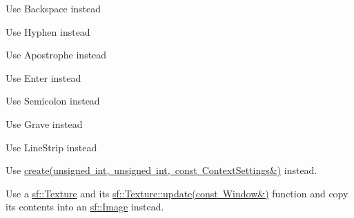 \begin{DoxyRefList}
%
Use Backspace instead  
\item[Member \mbox{\hyperlink{classsf_1_1Keyboard_acb4cacd7cc5802dec45724cf3314a142a401a183dcfde0a06cb60fe6c91fa1e39}{sf\+::Keyboard\+::Dash}} ]\label{deprecated__deprecated000020}%
%
Use Hyphen instead  
\item[Member \mbox{\hyperlink{classsf_1_1Keyboard_acb4cacd7cc5802dec45724cf3314a142af031edb6bcf319734a6664388958c475}{sf\+::Keyboard\+::Quote}} ]\label{deprecated__deprecated000025}%
%
Use Apostrophe instead  
\item[Member \mbox{\hyperlink{classsf_1_1Keyboard_acb4cacd7cc5802dec45724cf3314a142ac291de81bdee518d636bc359f2ca77de}{sf\+::Keyboard\+::Return}} ]\label{deprecated__deprecated000024}%
%
Use Enter instead  
\item[Member \mbox{\hyperlink{classsf_1_1Keyboard_acb4cacd7cc5802dec45724cf3314a142a460ab09a36f9ed230504b89b9815de88}{sf\+::Keyboard\+::Semi\+Colon}} ]\label{deprecated__deprecated000023}%
%
Use Semicolon instead  
\item[Member \mbox{\hyperlink{classsf_1_1Keyboard_acb4cacd7cc5802dec45724cf3314a142a90be0882086bccb516e3afc5c7fb82eb}{sf\+::Keyboard\+::Tilde}} ]\label{deprecated__deprecated000019}%
%
Use Grave instead  
\item[Member \mbox{\hyperlink{group__graphics_gga5ee56ac1339984909610713096283b1ba5b09910f5d0f39641342184ccd0d1de3}{sf\+::Lines\+Strip}} ]\label{deprecated__deprecated000001}%
%
Use Line\+Strip instead  
\item[Member \mbox{\hyperlink{classsf_1_1RenderTexture_a0e945c4ce7703591c7f240b169744603}{sf\+::Render\+Texture\+::create}} (unsigned int width, unsigned int height, bool depth\+Buffer)]\label{deprecated__deprecated000004}%
%
Use \mbox{\hyperlink{classsf_1_1RenderTexture_a49b7b723a80f89bc409a942364351dc3}{create(unsigned int, unsigned int, const Context\+Settings\&)}} instead. 
\item[Member \mbox{\hyperlink{classsf_1_1RenderWindow_a5a784b8a09bf4a8bc97ef9e0a8957c35}{sf\+::Render\+Window\+::capture}} () const]\label{deprecated__deprecated000005}%
%
 Use a \mbox{\hyperlink{classsf_1_1Texture}{sf\+::\+Texture}} and its \mbox{\hyperlink{classsf_1_1Texture_ad3cceef238f7d5d2108a98dd38c17fc5}{sf\+::\+Texture\+::update(const Window\&)}} function and copy its contents into an \mbox{\hyperlink{classsf_1_1Image}{sf\+::\+Image}} instead.  

\end{DoxyRefList}
